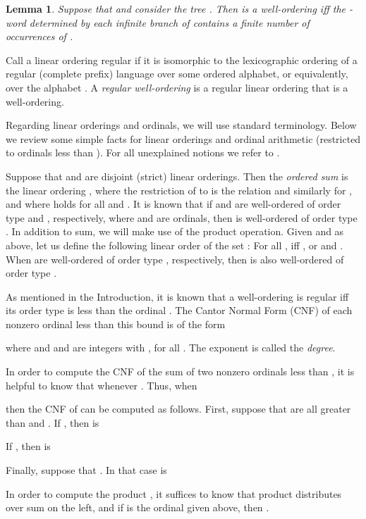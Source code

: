 \documentclass[copyright]{eptcs}
\newtheorem{lemma}[theorem]{\bf Lemma}        \newtheorem{sublemma}[theorem]{\bf Sublemma}	\newtheorem{proposition}[theorem]{\bf Proposition}  \newtheorem{corollary}[theorem]{\bf Corollary}
\begin{document}
\begin{lemma}
\label{lem-intro}
Suppose that  and consider the tree .
Then  is a well-ordering iff the -word 
determined by each infinite branch of  contains a 
finite number of occurrences of .
\end{lemma}


Call a linear ordering regular if it is isomorphic to the 
lexicographic ordering of a regular (complete prefix) language over some 
ordered alphabet, or equivalently, over the alphabet .
A \emph{regular well-ordering} is a regular linear ordering that is 
a well-ordering. 

Regarding linear orderings and ordinals, we will use standard 
terminology. Below we review some simple facts for 
linear orderings and ordinal arithmetic
(restricted to ordinals less than ). For all 
unexplained notions we refer to \cite{Rosenstein}.

Suppose that  and  are disjoint 
(strict) linear orderings.  
Then the \emph{ordered sum}  is the linear ordering 
, where the restriction of  to  is the relation 
and similarly for , and where  holds for all  and .
It is known that if  and  are well-ordered of order type
 and , respectively, where  and  are ordinals, 
then  is well-ordered of order type . 
In addition to sum, we will make use of the product operation. 
Given  and  as above, let us define the following 
linear order  of the set : For all , 
 iff , or  and . 
When  are well-ordered of order type , respectively, then 
 is also well-ordered of order type . 

As mentioned in the Introduction, it is known that a well-ordering 
is regular iff its order type is less than the ordinal .
The Cantor Normal Form (CNF) \cite{Rosenstein} 
of each nonzero ordinal less than this bound is of the form

where  and  and  are integers with  
,  for all . The 
exponent  is called the \emph{degree}.  

In order to compute the CNF of the 
sum of two nonzero ordinals less than , it is helpful to know 
that  whenever . 
Thus, when 

then the CNF of  can be computed as follows. 
First, suppose that  are all greater than 
and . If , then 
is

If , then  is

Finally, suppose that . In that case  is 

In order to compute the product , it suffices to know 
that product distributes over sum on the left, and if  is 
the ordinal given above, then . 
\end{document}
